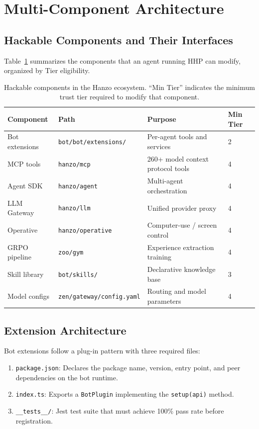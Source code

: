 \section{Multi-Component Architecture}

\label{sec:architecture}

\subsection{Hackable Components and Their Interfaces}
\label{sec:components}

Table~\ref{tab:components} summarizes the components that an agent running HHP
can modify, organized by Tier eligibility.

\begin{table}[H]
\centering
\begin{tabularx}{\textwidth}{l l X X}
\toprule
Component & Path & Purpose & Min Tier \\
\midrule
Bot extensions & \texttt{bot/bot/extensions/} & Per-agent tools and services & 2 \\
MCP tools & \texttt{hanzo/mcp} & 260+ model context protocol tools & 4 \\
Agent SDK & \texttt{hanzo/agent} & Multi-agent orchestration & 4 \\
LLM Gateway & \texttt{hanzo/llm} & Unified provider proxy & 4 \\
Operative & \texttt{hanzo/operative} & Computer-use / screen control & 4 \\
GRPO pipeline & \texttt{zoo/gym} & Experience extraction training & 4 \\
Skill library & \texttt{bot/skills/} & Declarative knowledge base & 3 \\
Model configs & \texttt{zen/gateway/config.yaml} & Routing and model parameters & 4 \\
\bottomrule
\end{tabularx}
\caption{Hackable components in the Hanzo ecosystem. ``Min Tier'' indicates the
minimum trust tier required to modify that component.}
\label{tab:components}
\end{table}

\subsection{Extension Architecture}
\label{sec:ext-arch}

Bot extensions follow a plug-in pattern with three required files:

\begin{enumerate}[leftmargin=1.5em]
    \item \texttt{package.json}: Declares the package name, version, entry
          point, and peer dependencies on the bot runtime.
    \item \texttt{index.ts}: Exports a \texttt{BotPlugin} implementing the
          \texttt{setup(api)} method.
    \item \texttt{\_\_tests\_\_/}: Jest test suite that must achieve 100\%
          pass rate before registration.
\end{enumerate}

